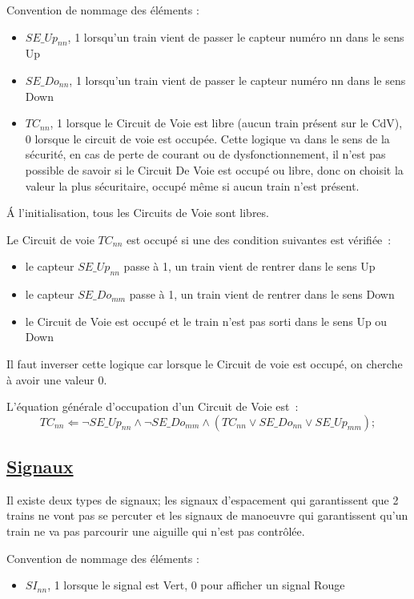 Convention de nommage des éléments :
\begin{itemize}
\item $SE\_Up_{nn}$, 1 lorsqu'un train vient de passer le capteur numéro
  nn dans le sens Up
\item $SE\_Do_{nn}$, 1 lorsqu'un train vient de passer le capteur numéro
  nn dans le sens Down
\item $TC_{nn}$, 1 lorsque le Circuit de Voie est libre (aucun train
  présent sur le CdV), 0 lorsque le circuit de voie est occupée. Cette
  logique va dans le sens de la sécurité, en cas de perte de courant
  ou de dysfonctionnement, il n'est pas possible de savoir si le
  Circuit De Voie est occupé ou libre, donc on choisit la valeur la
  plus sécuritaire, occupé même si aucun train n'est présent.
\end{itemize}

\'A l'initialisation, tous les Circuits de Voie sont libres.

\medskip
Le Circuit de voie $TC_{nn}$ est occupé si une des condition suivantes
est vérifiée~:
\begin{itemize}
\item le capteur $SE\_Up_{nn}$ passe à 1, un train vient de rentrer dans
  le sens Up
\item le capteur $SE\_Do_{mm}$ passe à 1, un train vient de rentrer dans
  le sens Down
\item le Circuit de Voie est occupé et le train n'est pas sorti dans
  le sens Up ou Down
\end{itemize}

Il faut inverser cette logique car lorsque le Circuit de voie est
occupé, on cherche à avoir une valeur 0.

\medskip
L'équation générale d'occupation d'un Circuit de Voie est~:
$$\boxed{
  TC_{nn} \Leftarrow \neg SE\_Up_{nn} \land \neg SE\_Do_{mm} \land
  (TC_{nn} \lor SE\_Do_{nn} \lor SE\_Up_{mm});
}$$


\subsection{\underline{Signaux}}
\label{sec:esp}

Il existe deux types de signaux; les signaux d'espacement qui
garantissent que 2 trains ne vont pas se percuter et les signaux de
manoeuvre qui garantissent qu'un train ne va pas parcourir une
aiguille qui n'est pas contrôlée.

Convention de nommage des éléments :
\begin{itemize}
\item $SI_{nn}$, 1 lorsque le signal est Vert, 0 pour afficher un signal
  Rouge
\end{itemize}

